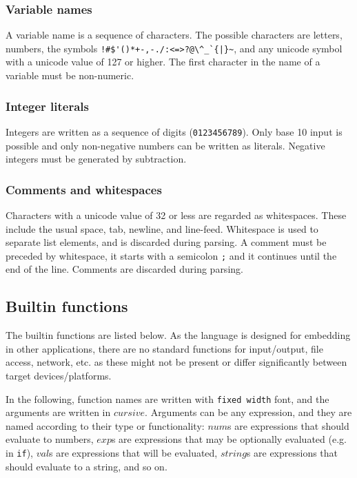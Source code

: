 \documentclass[11pt]{report}
\begin{document}
\subsubsection{Variable names}
A variable name is a sequence of characters. The possible characters are letters, numbers, the symbols \verb"!#$'()*+-,-./:<=>?@\^_`{|}~", and any unicode symbol with a unicode value of 127 or higher. The first character in the name of a variable must be non-numeric.

\subsubsection{Integer literals}

Integers are written as a sequence of digits (\verb|0123456789|). Only base 10 input is possible and only non-negative numbers can be written as literals. Negative integers must be generated by subtraction.

\subsubsection{Comments and whitespaces}
Characters with a unicode value of 32 or less are regarded as whitespaces. These include the usual space, tab, newline, and line-feed. Whitespace is used to separate list elements, and is discarded during parsing. A comment must be preceded by whitespace, it starts with a semicolon \verb|;| and it continues until the end of the line. Comments are discarded during parsing.

\subsection{Builtin functions}
The builtin functions are listed below. As the language is designed for embedding in other applications, there are no standard functions for input/output, file access, network, etc. as these might not be present or differ significantly between target devices/platforms.

In the following, function names are written with {\tt fixed width} font, and the arguments are written in $cursive$. Arguments can be any expression, and they are named according to their type or functionality: $num$s are expressions that should evaluate to numbers, $exp$s are expressions that may be optionally evaluated (e.g. in {\tt if}), $val$s are expressions that will be evaluated, $string$s are expressions that should evaluate to a string, and so on.
\end{document}
